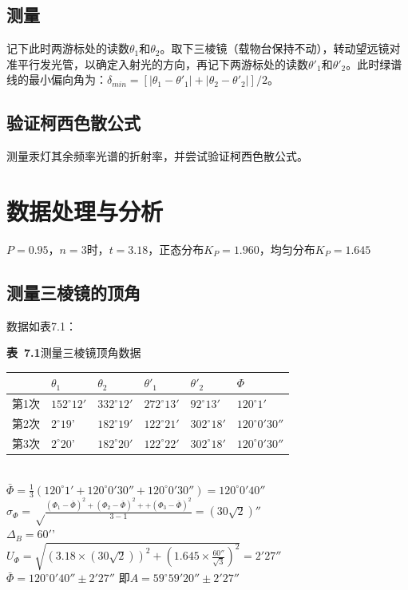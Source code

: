 \documentclass{article}
\def\kong{\hspace*{2em}}
\begin{document}
        \subsection{测量}
            \kong 记下此时两游标处的读数$\theta _1$和$\theta _2$。取下三棱镜（载物台保持不动），转动望远镜对准平行发光管，以确定入射光的方向，再记下两游标处的读数$\theta'_1$和$\theta '_2$。此时绿谱线的最小偏向角为：$\delta _{min}=[|\theta_1-\theta'_1|+|\theta_2-\theta'_2|]/2$。
        \subsection{验证柯西色散公式}
            \kong 测量汞灯其余频率光谱的折射率，并尝试验证柯西色散公式。
\section{数据处理与分析}
    \kong $P=0.95$，$n=3$时，$t=3.18$，正态分布$K_P=1.960$，均匀分布$K_P=1.645$
    \subsection{测量三棱镜的顶角}
        \kong 数据如表7.1：\\[12pt]
        \begin{minipage}{1\linewidth}
            \centering
            \textbf{表\ 7.1}\quad 测量三棱镜顶角数据  \\[4pt]
            \begin{tabular}{|l|l|l|l|l|l|} \hline
                    & $\theta_1$       & $\theta_2$       & $\theta'_1$      & $\theta'_2$      & $\Phi$              \\\hline
                第1次 & $152^{\circ}12'$ & $332^{\circ}12'$ & $272^{\circ}13'$ & $92^{\circ}13'$  & $120^{\circ}1'$     \\\hline
                第2次 & $2^{\circ}19$'   & $182^{\circ}19'$ & $122^{\circ}21'$ & $302^{\circ}18'$ & $120^{\circ}0'30''$ \\\hline
                第3次 & $2^{\circ}20$'   & $182^{\circ}20'$ & $122^{\circ}22'$ & $302^{\circ}18'$ & $120^{\circ}0'30''$ \\\hline
            \end{tabular}
        \end{minipage}\\[12pt]
        \kong $\displaystyle \bar \Phi=\frac{1}{3}(120^{\circ}1'+120^{\circ}0'30''+120^{\circ}0'30'')=120^{\circ}0'40''$\\
        \kong $\displaystyle \sigma_{\Phi}=\sqrt \frac{(\Phi_1-\bar \Phi)^2+(\Phi_2-\bar \Phi)^2++(\Phi_3-\bar \Phi)^2}{3-1}=(30\sqrt2)''$\\
        \kong $\Delta_B=60'’$\\
        \kong $\displaystyle  U_{\Phi}=\sqrt {(3.18\times (30\sqrt2))^2+(1.645\times \frac{60''}{\sqrt 3})^2}=2'27''$\\
        \kong $\bar \Phi=120^{\circ}0'40''\pm 2'27''$
        \kong 即$A=59^{\circ}59'20''\pm 2'27''$
\end{document}
